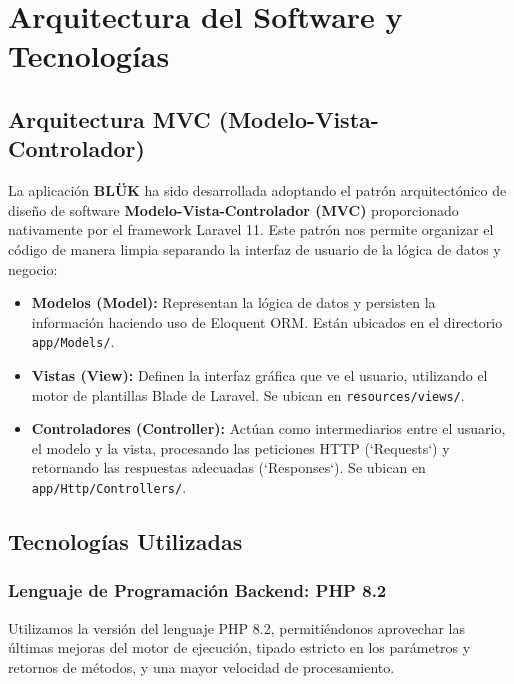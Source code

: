 \chapter{Arquitectura del Software y Tecnologías}

\section{Arquitectura MVC (Modelo-Vista-Controlador)}
La aplicación \textbf{BLÜK} ha sido desarrollada adoptando el patrón arquitectónico de diseño de software \textbf{Modelo-Vista-Controlador (MVC)} proporcionado nativamente por el framework Laravel 11. Este patrón nos permite organizar el código de manera limpia separando la interfaz de usuario de la lógica de datos y negocio:
\begin{itemize}
    \item \textbf{Modelos (Model):} Representan la lógica de datos y persisten la información haciendo uso de Eloquent ORM. Están ubicados en el directorio \texttt{app/Models/}.
    \item \textbf{Vistas (View):} Definen la interfaz gráfica que ve el usuario, utilizando el motor de plantillas Blade de Laravel. Se ubican en \texttt{resources/views/}.
    \item \textbf{Controladores (Controller):} Actúan como intermediarios entre el usuario, el modelo y la vista, procesando las peticiones HTTP (`Requests`) y retornando las respuestas adecuadas (`Responses`). Se ubican en \texttt{app/Http/Controllers/}.
\end{itemize}

\section{Tecnologías Utilizadas}

\subsection{Lenguaje de Programación Backend: PHP 8.2}
Utilizamos la versión del lenguaje PHP 8.2, permitiéndonos aprovechar las últimas mejoras del motor de ejecución, tipado estricto en los parámetros y retornos de métodos, y una mayor velocidad de procesamiento.

